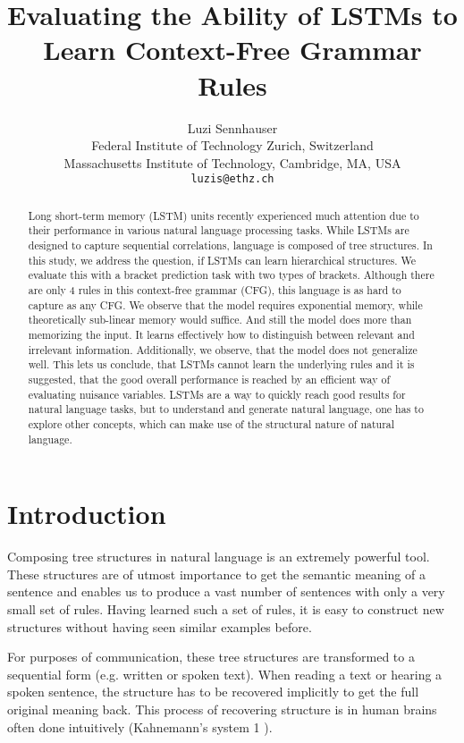\documentclass[11pt,a4paper]{article}
\title{Evaluating the Ability of LSTMs to Learn Context-Free Grammar Rules}
\author{Luzi Sennhauser \\
  Federal Institute of Technology Zurich, Switzerland \\
  Massachusetts Institute of Technology, Cambridge, MA, USA \\
  {\tt luzis@ethz.ch}
}
\date{}
\begin{document}
\maketitle
\begin{abstract}
Long short-term memory (LSTM) units recently experienced much attention due to their performance in various natural language processing tasks. While LSTMs are designed to capture sequential correlations, language is composed of tree structures. In this study, we address the question, if LSTMs can learn hierarchical structures. We evaluate this with a bracket prediction task with two types of brackets. Although there are only 4 rules in this context-free grammar (CFG), this language is as hard to capture as any CFG. We observe that the model requires exponential memory, while theoretically sub-linear memory would suffice. And still the model does more than memorizing the input. It learns effectively how to distinguish between relevant and irrelevant information. Additionally, we observe, that the model does not generalize well. This lets us conclude, that LSTMs cannot learn the underlying rules and it is suggested, that the good overall performance is reached by an efficient way of evaluating nuisance variables. LSTMs are a way to quickly reach good results for natural language tasks, but to understand and generate natural language, one has to explore other concepts, which can make use of the structural nature of natural language.
\end{abstract}

\section{Introduction}

Composing tree structures in natural language is an extremely powerful tool.  These structures are of utmost importance to get the semantic meaning of a sentence \cite{berwick2016only} and enables us to produce a vast number of sentences with only a very small set of rules. Having learned such a set of rules, it is easy to construct new structures without having seen similar examples before.

For purposes of communication, these tree structures are transformed to a sequential form (e.g. written or spoken text). When reading a text or hearing a spoken sentence, the structure has to be recovered implicitly to get the full original meaning back. This process of recovering structure is in human brains often done intuitively (Kahnemann's system 1 \cite{kahneman2011thinking}).
\end{document}
